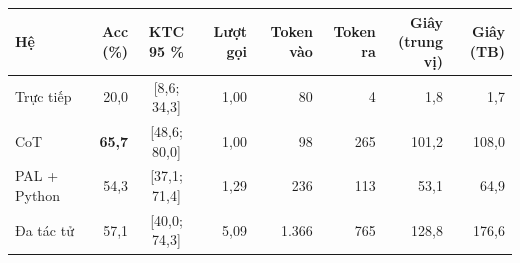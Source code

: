 \begin{tabular}{lrcrrrrr}
\toprule
Hệ & Acc (\%) & KTC 95 \% & Lượt gọi & Token vào & Token ra & \makecell[r]{Giây\\(trung vị)} & Giây (TB) \\
\midrule
Trực tiếp & 20{,}0 & [8{,}6; 34{,}3] & 1{,}00 & 80 & 4 & 1{,}8 & 1{,}7 \\
CoT & \textbf{65{,}7} & [48{,}6; 80{,}0] & 1{,}00 & 98 & 265 & 101{,}2 & 108{,}0 \\
PAL + Python & 54{,}3 & [37{,}1; 71{,}4] & 1{,}29 & 236 & 113 & 53{,}1 & 64{,}9 \\
Đa tác tử & 57{,}1 & [40{,}0; 74{,}3] & 5{,}09 & 1{.}366 & 765 & 128{,}8 & 176{,}6 \\
\bottomrule
\end{tabular}
